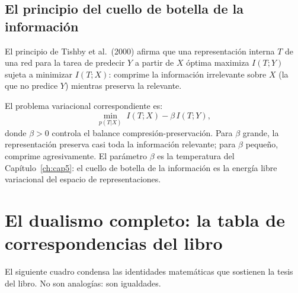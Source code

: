\subsection*{El principio del cuello de botella de la información}

El principio de Tishby et al.\ (2000) afirma que una representación interna
$T$ de una red para la tarea de predecir $Y$ a partir de $X$ óptima maximiza
$I(T;Y)$ sujeta a minimizar $I(T;X)$: comprime la información irrelevante
sobre $X$ (la que no predice $Y$) mientras preserva la relevante.

El problema variacional correspondiente es:
\begin{equation}
  \min_{p(T|X)}\; I(T;X) - \beta\, I(T;Y),
  \label{eq:ap_ib}
\end{equation}
donde $\beta > 0$ controla el balance compresión-preservación. Para $\beta$
grande, la representación preserva casi toda la información relevante; para
$\beta$ pequeño, comprime agresivamente. El parámetro $\beta$ es la temperatura
del Capítulo~\ref{ch:cap5}: el cuello de botella de la información es la
energía libre variacional del espacio de representaciones.

\section{El dualismo completo: la tabla de correspondencias del libro}
\label{sec:ap_tabla_completa}

El siguiente cuadro condensa las identidades matemáticas que sostienen la tesis
del libro. No son analogías: son igualdades.

